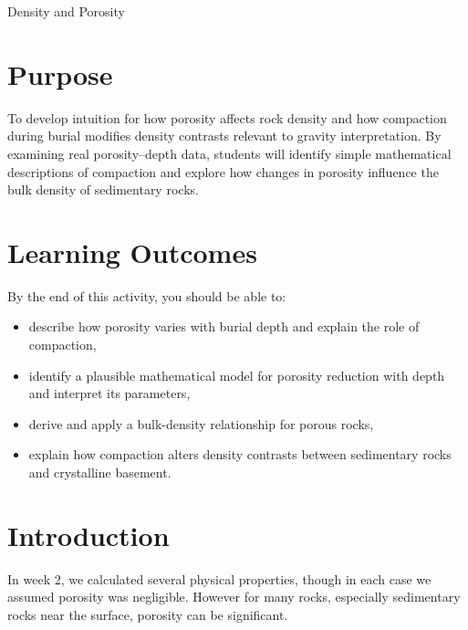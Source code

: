 \begin{activity}{Density and Porosity}

\section*{Purpose}
To develop intuition for how porosity affects rock density and how compaction during burial modifies density contrasts relevant to gravity interpretation. By examining real porosity--depth data, students will identify simple mathematical descriptions of compaction and explore how changes in porosity influence the bulk density of sedimentary rocks.

\section*{Learning Outcomes}

By the end of this activity, you should be able to:
\begin{itemize}
  \item describe how porosity varies with burial depth and explain the role of compaction,
  \item identify a plausible mathematical model for porosity reduction with depth and interpret its parameters,
  \item derive and apply a bulk-density relationship for porous rocks,
  \item explain how compaction alters density contrasts between sedimentary rocks and crystalline basement.
\end{itemize}

\section*{Introduction}
In week 2, we calculated several physical properties, though in each case we assumed porosity was negligible. However for many rocks, especially sedimentary rocks near the surface, porosity can be significant.


\end{activity}
